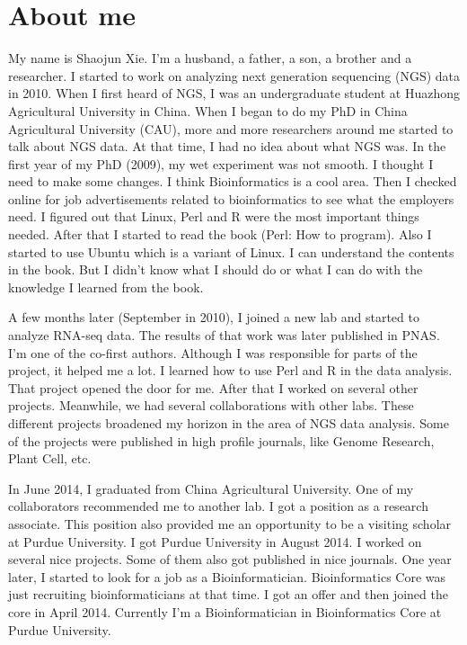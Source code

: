 \documentclass[]{book}
\theoremstyle{definition}
\theoremstyle{definition}
\theoremstyle{definition}
\theoremstyle{remark}
\begin{document}
\section*{About me}\label{about-me}

My name is Shaojun Xie. I'm a husband, a father, a son, a brother and a
researcher. I started to work on analyzing next generation sequencing
(NGS) data in 2010. When I first heard of NGS, I was an undergraduate
student at Huazhong Agricultural University in China. When I began to do
my PhD in China Agricultural University (CAU), more and more researchers
around me started to talk about NGS data. At that time, I had no idea
about what NGS was. In the first year of my PhD (2009), my wet
experiment was not smooth. I thought I need to make some changes. I
think Bioinformatics is a cool area. Then I checked online for job
advertisements related to bioinformatics to see what the employers need.
I figured out that Linux, Perl and R were the most important things
needed. After that I started to read the book (Perl: How to program).
Also I started to use Ubuntu which is a variant of Linux. I can
understand the contents in the book. But I didn't know what I should do
or what I can do with the knowledge I learned from the book.

A few months later (September in 2010), I joined a new lab and started
to analyze RNA-seq data. The results of that work was later published in
PNAS. I'm one of the co-first authors. Although I was responsible for
parts of the project, it helped me a lot. I learned how to use Perl and
R in the data analysis. That project opened the door for me. After that
I worked on several other projects. Meanwhile, we had several
collaborations with other labs. These different projects broadened my
horizon in the area of NGS data analysis. Some of the projects were
published in high profile journals, like Genome Research, Plant Cell,
etc.

In June 2014, I graduated from China Agricultural University. One of my
collaborators recommended me to another lab. I got a position as a
research associate. This position also provided me an opportunity to be
a visiting scholar at Purdue University. I got Purdue University in
August 2014. I worked on several nice projects. Some of them also got
published in nice journals. One year later, I started to look for a job
as a Bioinformatician. Bioinformatics Core was just recruiting
bioinformaticians at that time. I got an offer and then joined the core
in April 2014. Currently I'm a Bioinformatician in Bioinformatics Core
at Purdue University.
\end{document}
